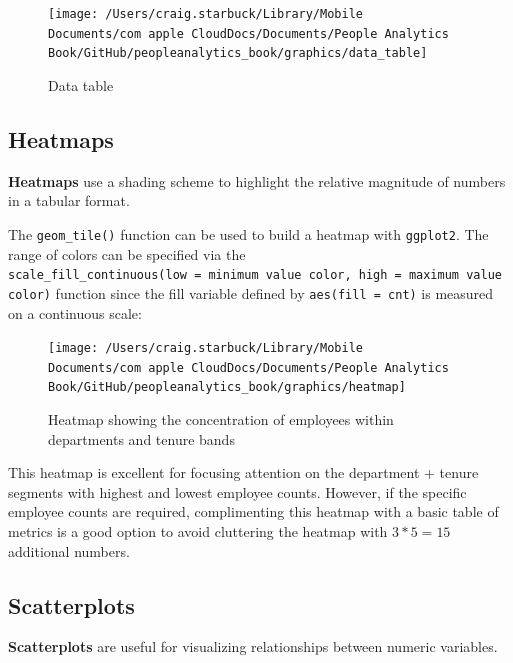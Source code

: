 \documentclass[
]{book}
\begin{document}
\begin{figure}

{\centering \texttt{[image: /Users/craig.starbuck/Library/Mobile Documents/com~apple~CloudDocs/Documents/People Analytics Book/GitHub/peopleanalytics\_book/graphics/data\_table]} 

}

\caption{Data table}\label{fig:table}
\end{figure}

\hypertarget{heatmaps}{%
\subsection{Heatmaps}\label{heatmaps}}

\textbf{Heatmaps} use a shading scheme to highlight the relative magnitude of numbers in a tabular format.

The \texttt{geom\_tile()} function can be used to build a heatmap with \texttt{ggplot2}. The range of colors can be specified via the \texttt{scale\_fill\_continuous(low\ =\ \textquotesingle{}minimum\ value\ color\textquotesingle{},\ high\ =\ \textquotesingle{}maximum\ value\ color\textquotesingle{})} function since the fill variable defined by \texttt{aes(fill\ =\ cnt)} is measured on a continuous scale:

\begin{figure}

{\centering \texttt{[image: /Users/craig.starbuck/Library/Mobile Documents/com~apple~CloudDocs/Documents/People Analytics Book/GitHub/peopleanalytics\_book/graphics/heatmap]} 

}

\caption{Heatmap showing the concentration of employees within departments and tenure bands}\label{fig:heatmap}
\end{figure}

This heatmap is excellent for focusing attention on the department + tenure segments with highest and lowest employee counts. However, if the specific employee counts are required, complimenting this heatmap with a basic table of metrics is a good option to avoid cluttering the heatmap with \(3*5 = 15\) additional numbers.

\hypertarget{scatterplots}{%
\subsection{Scatterplots}\label{scatterplots}}

\textbf{Scatterplots} are useful for visualizing relationships between numeric variables.
\end{document}
